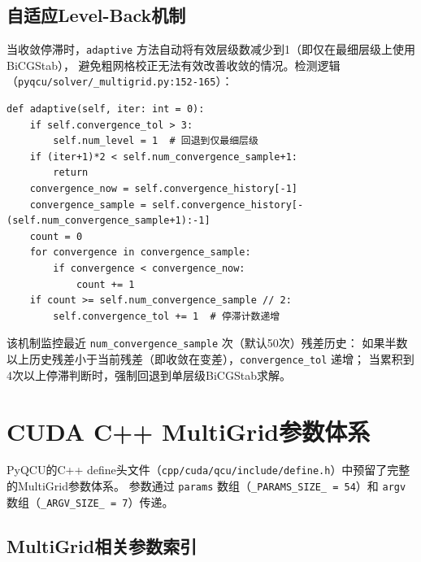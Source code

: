 \documentclass[11pt,a4paper]{article}
\begin{document}
\subsection{自适应Level-Back机制}

当收敛停滞时，\texttt{adaptive} 方法自动将有效层级数减少到1（即仅在最细层级上使用BiCGStab），
避免粗网格校正无法有效改善收敛的情况。检测逻辑（\texttt{pyqcu/solver/\_multigrid.py:152-165}）：

\begin{lstlisting}[style=pythonstyle]
def adaptive(self, iter: int = 0):
    if self.convergence_tol > 3:
        self.num_level = 1  # 回退到仅最细层级
    if (iter+1)*2 < self.num_convergence_sample+1:
        return
    convergence_now = self.convergence_history[-1]
    convergence_sample = self.convergence_history[-(self.num_convergence_sample+1):-1]
    count = 0
    for convergence in convergence_sample:
        if convergence < convergence_now:
            count += 1
    if count >= self.num_convergence_sample // 2:
        self.convergence_tol += 1  # 停滞计数递增
\end{lstlisting}

该机制监控最近 \texttt{num\_convergence\_sample} 次（默认50次）残差历史：
如果半数以上历史残差小于当前残差（即收敛在变差），\texttt{convergence\_tol} 递增；
当累积到4次以上停滞判断时，强制回退到单层级BiCGStab求解。

\section{CUDA C++ MultiGrid参数体系}

PyQCU的C++ define头文件（\texttt{cpp/cuda/qcu/include/define.h}）中预留了完整的MultiGrid参数体系。
参数通过 \texttt{params} 数组（\texttt{\_PARAMS\_SIZE\_ = 54}）和 \texttt{argv} 数组（\texttt{\_ARGV\_SIZE\_ = 7}）传递。

\subsection{MultiGrid相关参数索引}
\end{document}
